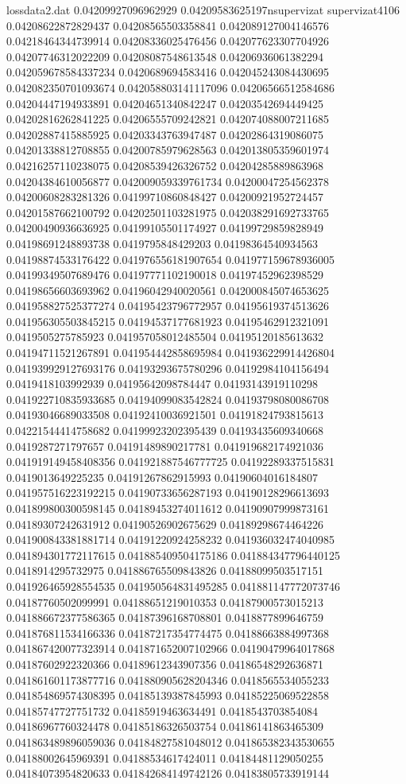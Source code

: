 \begin{filecontents*}{lossdata2.dat}
0.04209927096962929
0.04209583625197nsupervizat
supervizat4106
0.04208622872829437
0.04208565503358841
0.042089127004146576
0.04218464344739914
0.04208336025476456
0.042077623307704926
0.04207746312022209
0.04208087548613548
0.04206936061382294
0.042059678584337234
0.0420689694583416
0.042045243084430695
0.042082350701093674
0.042058803141117096
0.04206566512584686
0.04204447194933891
0.04204651340842247
0.04203542694449425
0.04202816262841225
0.04206555709242821
0.042074088007211685
0.04202887415885925
0.04203343763947487
0.04202864319086075
0.04201338812708855
0.04200785979628563
0.042013805359601974
0.04216257110238075
0.04208539426326752
0.04204285889863968
0.04204384610056877
0.042009059339761734
0.04200047254562378
0.04200608283281326
0.04199710860848427
0.04200921952724457
0.04201587662100792
0.04202501103281975
0.042038291692733765
0.04200490936636925
0.04199105501174927
0.04199729859828949
0.04198691248893738
0.0419795848429203
0.04198364540934563
0.04198874533176422
0.041976556181907654
0.041977159678936005
0.04199349507689476
0.04197771102190018
0.04197452962398529
0.04198656603693962
0.04196042940020561
0.042000845074653625
0.041958827525377274
0.04195423796772957
0.04195619374513626
0.041956305503845215
0.04194537177681923
0.04195462912321091
0.0419505275785923
0.041957058012485504
0.04195120185613632
0.04194711521267891
0.041954442858695984
0.041936229914426804
0.041939929127693176
0.04193293675780296
0.04192984104156494
0.0419418103992939
0.04195642098784447
0.04193143919110298
0.041922710835933685
0.04194099083542824
0.04193798080086708
0.04193046689033508
0.04192410036921501
0.04191824793815613
0.04221544414758682
0.04199923202395439
0.04193435609340668
0.0419287271797657
0.04191489890217781
0.041919682174921036
0.041919149458408356
0.041921887546777725
0.04192289337515831
0.0419013649225235
0.04191267862915993
0.04190604016184807
0.041957516223192215
0.04190733656287193
0.04190128296613693
0.041899800300598145
0.04189453274011612
0.04190907999873161
0.04189307242631912
0.04190526902675629
0.04189298674464226
0.041900843381881714
0.04191220924258232
0.041936032474040985
0.041894301772117615
0.041885409504175186
0.041884347796440125
0.0418914295732975
0.041886765509843826
0.04188099503517151
0.041926465928554535
0.041950564831495285
0.041881147772073746
0.04187760502099991
0.04188651219010353
0.04187900573015213
0.041886672377586365
0.04187396168708801
0.0418877899646759
0.041876811534166336
0.04187217354774475
0.04188663884997368
0.041867420077323914
0.041871652007102966
0.04190479964017868
0.04187602922320366
0.04189612343907356
0.04186548292636871
0.041861601173877716
0.041880905628204346
0.0418565534055233
0.041854869574308395
0.04185139387845993
0.04185225069522858
0.04185747727751732
0.04185919463634491
0.0418543703854084
0.04186967760324478
0.04185186326503754
0.04186141863465309
0.041863489896059036
0.04184827581048012
0.041865382343530655
0.04188002645969391
0.04188534617424011
0.04184481129050255
0.04184073954820633
0.041842684149742126
0.04183805733919144

\end{filecontents*}




